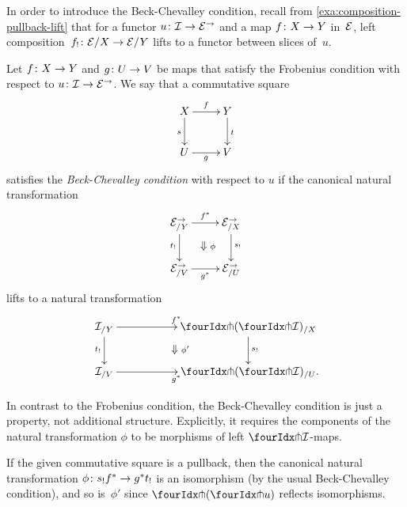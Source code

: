 \documentclass[reqno,10pt,a4paper,oneside,draft]{amsart}
\begin{document}
In order to introduce the Beck-Chevalley condition, recall from \cref{exa:composition-pullback-lift} that for a functor $u \colon \mathcal{I} \to \mathcal{E}^\to$ and a map $f \colon X \to Y$ in~$\mathcal{E}$, left composition~$f_! \colon \mathcal{E}/X \to \mathcal{E}/Y$ lifts to a functor between slices of~$u$.

\begin{definition} \label{def:beck-chevalley}
Let $f \colon X \to Y$ and $g \colon U \to V$ be maps that satisfy the Frobenius condition with respect to $u \colon \mathcal{I} \to \mathcal{E}^\to$.
We say that a commutative square
\begin{equation} \label{def:beck-chevalley:0}
\begin{gathered}
\xymatrix{
  X
  \ar[r]^{f}
  \ar[d]_{s}
&
  Y
  \ar[d]^{t}
\\
  U
  \ar[r]_{g}
&
  V
}
\end{gathered}
\end{equation}
satisfies the \emph{Beck-Chevalley condition} with respect to $u$ if the canonical natural transformation
\[
\xymatrix{
  \catE^\to_{/Y}
  \ar[d]_{t_!}
  \ar[r]^{f^*}
  \ar@{}[dr]|{\textstyle\Downarrow \rlap{$\labelstyle\phi$}}
&
  \catE^\to_{/X}
  \ar[d]^{s_!}
\\
  \catE^\to_{/V}
  \ar[r]_{g^*}
&
  \catE^\to_{/U}
}
\]
lifts to a natural transformation
\[
\xymatrix@C+3em{
  \cal{I}_{/Y}
  \ar[r]^{f^*}
  \ar[d]_{t_!}
  \ar@{}[dr]|{\textstyle\Downarrow \rlap{$\labelstyle\phi'$}}
&
  \liftl{(\liftr{\cal{I}})}_{/X}
  \ar[d]^{s_!}
\\
  \cal{I}_{/V}
  \ar[r]_{g^*}
&
  \liftl{(\liftr{\cal{I}})}_{/U}
\rlap{.}}
\]
\end{definition}

\begin{remark} \label{beck-chevalley-no-coherence}
In contrast to the Frobenius condition, the Beck-Chevalley condition is just a property, not additional structure.
Explicitly, it requires the components of the natural transformation $\phi$ to be morphisms of left $\liftr{\cal{I}}$-maps.
\end{remark}

\begin{remark} \label{beck-chevalley-iso}
If the given commutative square is a pullback, then the canonical natural transformation $\phi \colon s_! f^* \to g^* t_!$ is an isomorphism (by the usual Beck-Chevalley condition), and so is~$\phi'$ since $\liftl{(\liftr{u})}$ reflects isomorphisms.
\end{remark}
\end{document}
